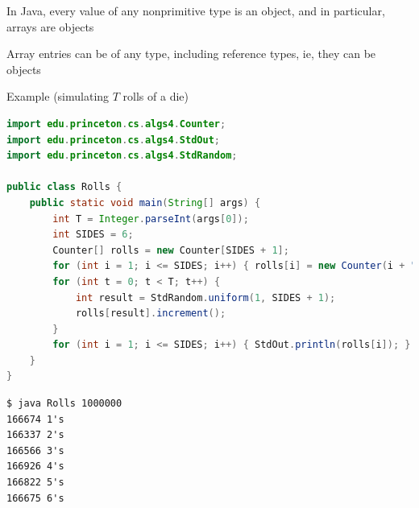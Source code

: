 \documentclass[8pt,a4paper,compress]{beamer}
\begin{document}
\begin{frame}[fragile]
\pause

In Java, every value of any nonprimitive type is an object, and in particular, arrays are objects 

\pause
\bigskip

Array entries can be of any type, including reference types, ie, they can be objects

\pause
\bigskip

Example (simulating $T$ rolls of a die)

\begin{lstlisting}[language=Java]
import edu.princeton.cs.algs4.Counter;
import edu.princeton.cs.algs4.StdOut;
import edu.princeton.cs.algs4.StdRandom;

public class Rolls {
    public static void main(String[] args) {
        int T = Integer.parseInt(args[0]);
        int SIDES = 6;
        Counter[] rolls = new Counter[SIDES + 1];
        for (int i = 1; i <= SIDES; i++) { rolls[i] = new Counter(i + "'s"); }
        for (int t = 0; t < T; t++) {
            int result = StdRandom.uniform(1, SIDES + 1);
            rolls[result].increment();
        }
        for (int i = 1; i <= SIDES; i++) { StdOut.println(rolls[i]); }
    }
}
\end{lstlisting}

\pause

\begin{lstlisting}[language={}]
$ java Rolls 1000000
166674 1's
166337 2's
166566 3's
166926 4's
166822 5's
166675 6's
\end{lstlisting}
\end{frame}
\end{document}
